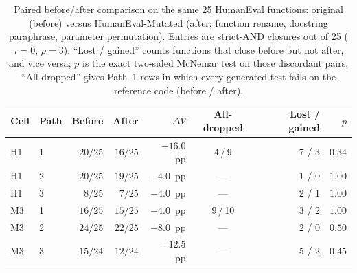 \begin{table}[!htbp]
  \centering
  \small
  \caption{Paired before/after comparison on the same 25 HumanEval functions:
    original (before) versus HumanEval-Mutated (after; function rename,
    docstring paraphrase, parameter permutation). Entries are strict-AND
    closures out of 25 ($\tau = 0$, $\rho = 3$). ``Lost / gained'' counts
    functions that close before but not after, and vice versa; $p$ is the
    exact two-sided McNemar test on those discordant pairs. ``All-dropped''
    gives Path~1 rows in which every generated test fails on the reference
    code (before / after).}
  \label{tab:paired_hem_before_after}
  \begin{tabular}{llrrrcrr}
    \toprule
    Cell & Path & Before & After & $\Delta V$ & All-dropped & Lost / gained & $p$ \\
    \midrule
    H1 & 1 & $20/25$ & $16/25$ & $-16.0$~pp & 4\,/\,9 & 7 / 3 & $0.34$ \\
    H1 & 2 & $20/25$ & $19/25$ & $-4.0$~pp & --- & 1 / 0 & $1.00$ \\
    H1 & 3 & $8/25$ & $7/25$ & $-4.0$~pp & --- & 2 / 1 & $1.00$ \\
    \midrule
    M3 & 1 & $16/25$ & $15/25$ & $-4.0$~pp & 9\,/\,10 & 3 / 2 & $1.00$ \\
    M3 & 2 & $24/25$ & $22/25$ & $-8.0$~pp & --- & 2 / 0 & $0.50$ \\
    M3 & 3 & $15/24$ & $12/24$ & $-12.5$~pp & --- & 5 / 2 & $0.45$ \\
    \bottomrule
  \end{tabular}
\end{table}
